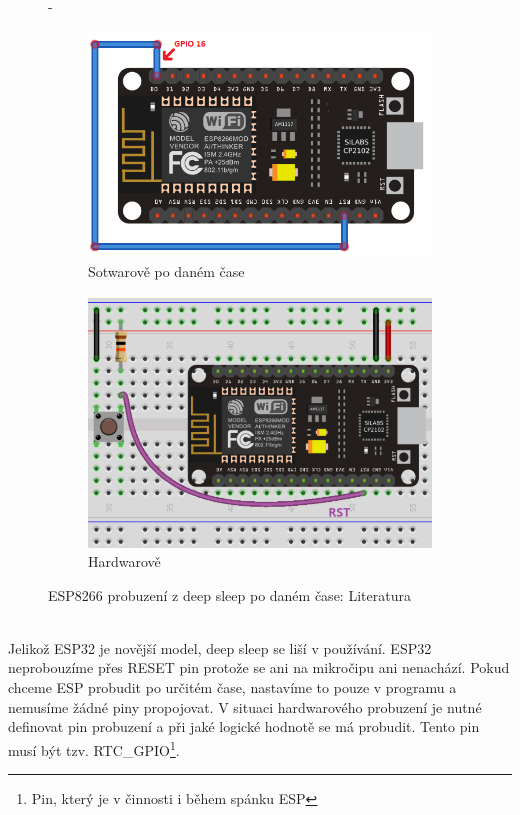 \documentclass[a4paper, 12pt]{report}
\begin{document}
    \begin{figure}[h!]
        \centering-
        \begin{subfigure}[b]{0.4\linewidth}
            \includegraphics[width=\linewidth]{images/ESP8266_timed_deepsleep}
            \caption{Sotwarově po daném čase}
        \end{subfigure}
        \begin{subfigure}[b]{0.4\linewidth}
            \includegraphics[width=\linewidth]{images/ESP8266_pressed_deepsleep}
            \caption{Hardwarově}
        \end{subfigure}
        \caption{ESP8266 probuzení z deep sleep po daném čase: Literatura~\cite{randomnerd}}
        \label{fig:esp8266_timed_pressed_deepsleep}
    \end{figure}\\
    Jelikož ESP32 je novější model, deep sleep se liší v používání. ESP32 neprobouzíme přes RESET pin protože se ani na mikročipu ani nenachází. Pokud chceme ESP probudit po určitém čase, nastavíme to pouze v programu a nemusíme žádné piny propojovat. V situaci hardwarového probuzení je nutné definovat pin probuzení a při jaké logické hodnotě se má probudit. Tento pin musí být tzv. RTC\_GPIO\footnote{Pin, který je v činnosti i během spánku ESP}.
\end{document}
